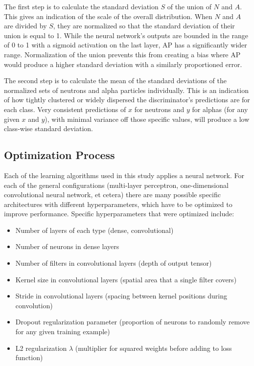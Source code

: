 \documentclass[10pt]{article}
\begin{document}
The first step is to calculate the standard deviation $S$ of the union of $N$ and $A$. This gives an indication of the scale of the overall distribution. When $N$ and $A$ are divided by $S$, they are normalized so that the standard deviation of their union is equal to 1. While the neural network's outputs are bounded in the range of 0 to 1 with a sigmoid activation on the last layer, AP has a significantly wider range. Normalization of the union prevents this from creating a bias where AP would produce a higher standard deviation with a similarly proportioned error.

The second step is to calculate the mean of the standard deviations of the normalized sets of neutrons and alpha particles individually. This is an indication of how tightly clustered or widely dispersed the discriminator's predictions are for each class. Very consistent predictions of $x$ for neutrons and $y$ for alphas (for any given $x$ and $y$), with minimal variance off those specific values, will produce a low class-wise standard deviation.

\subsection{Optimization Process}

Each of the learning algorithms used in this study applies a neural network. For each of the general configurations (multi-layer perceptron, one-dimensional convolutional neural network, et cetera) there are many possible specific architectures with different hyperparameters, which have to be optimized to improve performance. Specific hyperparameters that were optimized include:

\begin{itemize}
    \item Number of layers of each type (dense, convolutional)
    \item Number of neurons in dense layers
    \item Number of filters in convolutional layers (depth of output tensor)
    \item Kernel size in convolutional layers (spatial area that a single filter covers)
    \item Stride in convolutional layers (spacing between kernel positions during convolution)
    \item Dropout regularization parameter (proportion of neurons to randomly remove for any given training example)
    \item L2 regularization $\lambda$ (multiplier for squared weights before adding to loss function)
\end{itemize}
\end{document}
